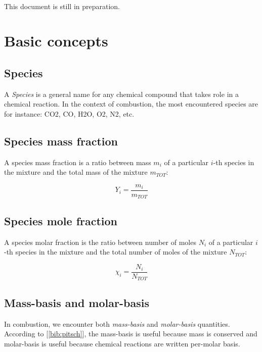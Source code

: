 \documentclass[10pt,twocolumn]{article}
\begin{document}
\,\,

This document is still in preparation.

\tableofcontents

\section{Basic concepts}

\subsection{Species}

A \textit{Species} is a general name for any chemical compound that takes role in a chemical reaction. In the context of combustion, the most encountered species are for instance: CO2, CO, H2O, O2, N2, etc.

\subsection{Species mass fraction}

A species mass fraction is a ratio between mass $m_i$ of a particular $i$-th species in the mixture and the total mass of the mixture $m_{TOT}$:

\begin{equation}
Y_i = \frac{m_i}{m_{TOT}}
\end{equation}

\subsection{Species mole fraction}

A species molar fraction is the ratio between number of moles $N_i$ of a particular $i$-th species in the mixture and the total number of moles of the mixture $N_{TOT}$:

\begin{equation}
\chi_i = \frac{N_i}{N_{TOT}}
\end{equation}

\subsection{Mass-basis and molar-basis}

In combustion, we encounter both \textit{mass-basis} and \textit{molar-basis} quantities. According to [\ref{bib:pitsch}], the mass-basis is useful because mass is conserved and molar-basis is useful because chemical reactions are written per-molar basis.
\end{document}
